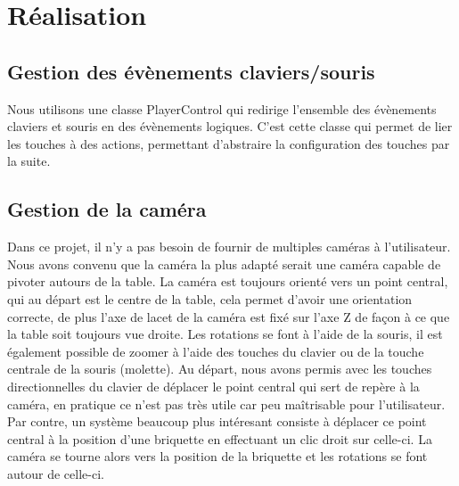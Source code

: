 \documentclass[frenchb,twoside]{EPURapport}
\begin{document}
    
    

\chapter{Réalisation}
    \section{Gestion des évènements claviers/souris}
        Nous utilisons une classe PlayerControl qui redirige l'ensemble des
        évènements claviers et souris en des évènements logiques. C'est cette
        classe qui permet de lier les touches à des actions, permettant
        d'abstraire la configuration des touches par la suite.

    \section{Gestion de la caméra}
        Dans ce projet, il n'y a pas besoin de fournir de multiples caméras à
        l'utilisateur. Nous avons convenu que la caméra la plus adapté serait
        une caméra capable de pivoter autours de la table. La caméra est
        toujours orienté vers un point central, qui au départ est le centre de
        la table, cela permet d'avoir une orientation correcte, de plus l'axe
        de lacet de la caméra est fixé sur l'axe Z de façon à ce que la table
        soit toujours vue droite. Les rotations se font à l'aide de la souris,
        il est également possible de zoomer à l'aide des touches du clavier
         ou de la touche centrale de la souris (molette).
        Au départ, nous avons permis avec les touches directionnelles du clavier de
        déplacer le point central qui sert de repère à la caméra, en pratique
        ce n'est pas très utile car peu maîtrisable pour l'utilisateur. Par
        contre, un système beaucoup plus intéresant consiste à déplacer ce point
        central à la position d'une briquette en effectuant un clic droit sur
        celle-ci. La caméra se tourne alors vers la position de la briquette et les rotations
        se font autour de celle-ci.
\end{document}
